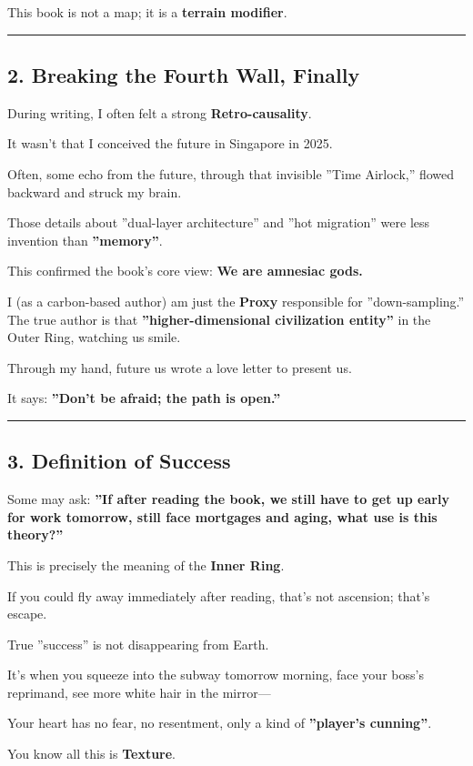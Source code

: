 This book is not a map; it is a \textbf{terrain modifier}.

\hrule

\subsection{2. Breaking the Fourth Wall, Finally}

During writing, I often felt a strong \textbf{Retro-causality}.

It wasn't that I conceived the future in Singapore in 2025.

Often, some echo from the future, through that invisible ''Time Airlock,'' flowed backward and struck my brain.

Those details about ''dual-layer architecture'' and ''hot migration'' were less invention than \textbf{''memory''}.

This confirmed the book's core view: \textbf{We are amnesiac gods.}

I (as a carbon-based author) am just the \textbf{Proxy} responsible for ''down-sampling.'' The true author is that \textbf{''higher-dimensional civilization entity''} in the Outer Ring, watching us smile.

Through my hand, future us wrote a love letter to present us.

It says: \textbf{''Don't be afraid; the path is open.''}

\hrule

\subsection{3. Definition of Success}

Some may ask: \textbf{''If after reading the book, we still have to get up early for work tomorrow, still face mortgages and aging, what use is this theory?''}

This is precisely the meaning of the \textbf{Inner Ring}.

If you could fly away immediately after reading, that's not ascension; that's escape.

True ''success'' is not disappearing from Earth.

It's when you squeeze into the subway tomorrow morning, face your boss's reprimand, see more white hair in the mirror---

Your heart has no fear, no resentment, only a kind of \textbf{''player's cunning''}.

You know all this is \textbf{Texture}.

